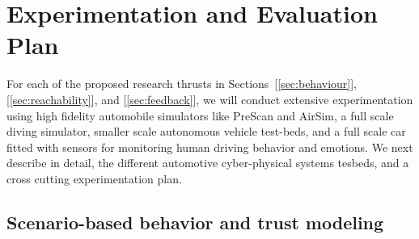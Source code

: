 
\section{Experimentation and Evaluation Plan}
For each of the proposed research thrusts in Sections~[\ref{sec:behaviour}],[\ref{sec:reachability}], and [\ref{sec:feedback}], we will conduct extensive experimentation using high fidelity automobile simulators like PreScan and AirSim, a full scale diving simulator, smaller scale autonomous vehicle test-beds, and a full scale car fitted with sensors for monitoring human driving behavior and emotions. We next describe in detail, the different automotive cyber-physical systems tesbeds, and a cross cutting experimentation plan. 

\subsection{Scenario-based behavior and trust modeling}
\label{subsec:trust-modeling}



